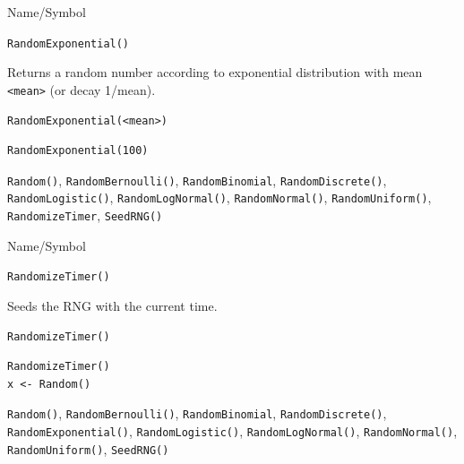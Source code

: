 \begin{desc}{Name/Symbol}
\item[Name/Symbol]	\verb+RandomExponential()+

\item[Description]	Returns a random number according to exponential 
		distribution with mean \verb+<mean>+ (or decay 1/mean).

\item[Usage]		
\begin{verbatim}
RandomExponential(<mean>)
\end{verbatim}

\item[Example]	
\begin{verbatim}
RandomExponential(100)
\end{verbatim}

\item[See Also]	\verb+Random()+, \verb+RandomBernoulli()+, \verb+RandomBinomial+,
		\verb+RandomDiscrete()+, \verb+RandomLogistic()+, \verb+RandomLogNormal()+, 
		\verb+RandomNormal()+, \verb+RandomUniform()+, \verb+RandomizeTimer+, \verb+SeedRNG()+
\end{desc}




\begin{desc}{Name/Symbol}
\item[Name/Symbol]	\verb+RandomizeTimer()+

\item[Description]	Seeds the RNG with the current time.

\item[Usage]
\begin{verbatim}
RandomizeTimer()
\end{verbatim}

\item[Example]	
\begin{verbatim}
RandomizeTimer()
x <- Random()
\end{verbatim}
	     
\item[See Also]	\verb+Random()+, \verb+RandomBernoulli()+, \verb+RandomBinomial+,
		\verb+RandomDiscrete()+, \verb+RandomExponential()+, \verb+RandomLogistic()+,
		\verb+RandomLogNormal()+, \verb+RandomNormal()+, \verb+RandomUniform()+, \verb+SeedRNG()+
\end{desc}

